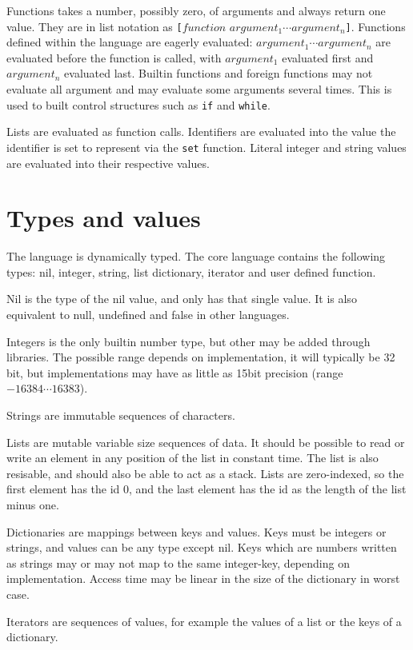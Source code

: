 Functions takes a number, possibly zero, of arguments and always return one value.
They are in list notation as \verb|[|$function$ $argument_1 \cdots argument_n$\verb|]|.
Functions defined within the language are eagerly evaluated: $argument_1\cdots argument_n$ are evaluated before the function is called, with $argument_1$ evaluated first and $argument_n$ evaluated last.
Builtin functions and foreign functions may not evaluate all argument and may evaluate some arguments several times. This is used to built control structures such as \verb|if| and \verb|while|.

Lists are evaluated as function calls.
Identifiers are evaluated into the value the identifier is set to represent via the \verb|set| function.
Literal integer and string values are evaluated into their respective values.

\section{Types and values}
The language is dynamically typed.
The core language contains the following types: nil, integer, string, list dictionary, iterator and user defined function.

Nil is the type of the nil value, and only has that single value. It is also equivalent to null, undefined and false in other languages.

Integers is the only builtin number type, but other may be added through libraries. The possible range depends on implementation, it will typically be 32 bit, but implementations may have as little as 15bit precision (range $-16384\cdots 16383$).

Strings are immutable sequences of characters.

Lists are mutable variable size sequences of data. It should be possible to read or write an element in any position of the list in constant time. The list is also resisable, and should also be able to act as a stack. 
Lists are zero-indexed, so the first element has the id 0, and the last element has the id as the length of the list minus one.

Dictionaries are mappings between keys and values. Keys must be integers or strings, and values can be any type except nil. Keys which are numbers written as strings may or may not map to the same integer-key, depending on implementation. Access time may be linear in the size of the dictionary in worst case.

Iterators are sequences of values, for example the values of a list or the keys of a dictionary. 

